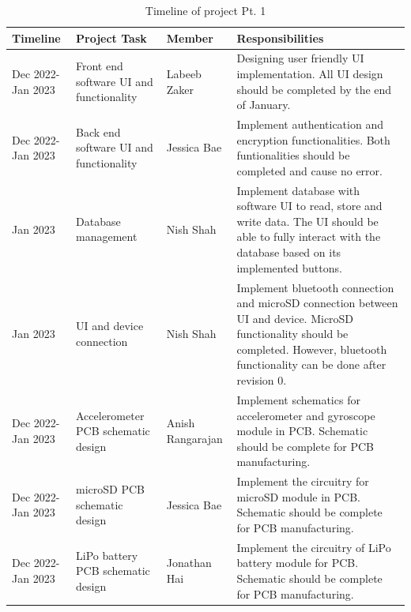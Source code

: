 \documentclass[12pt, titlepage]{article}
\begin{document}
\begin{table}[H]
\caption{\label{Timeline}Timeline of project Pt. 1}  
	\begin{tabular}{ | p{2.25cm} | p{4cm} |  p{3.5cm} | p{5.5cm} |}
		 \hline
		 \textbf{Timeline} & \textbf{Project Task} & \textbf{Member} & \textbf{Responsibilities}\\
		 \hline
		Dec 2022\newline- Jan 2023 & Front end software UI and functionality & Labeeb Zaker & Designing user friendly UI implementation. All UI design should be completed by the end of January.\\
		\hline
		Dec 2022\newline- Jan 2023 & Back end software UI and functionality & Jessica Bae & Implement authentication and encryption functionalities. Both funtionalities should be completed and cause no error. \\
		\hline
		Jan 2023 & Database management & Nish Shah & Implement database with software UI to read, store and write data. The UI should be able to fully interact with the database based on its implemented buttons.\\
		\hline
		Jan 2023 & UI and device connection & Nish Shah &Implement bluetooth connection and microSD connection between UI and device. MicroSD functionality should be completed. However, bluetooth functionality can be done after revision 0.\\
		\hline
		Dec 2022\newline- Jan 2023 & Accelerometer PCB schematic design & Anish Rangarajan & Implement schematics for accelerometer and gyroscope module in PCB. Schematic should be complete for PCB manufacturing.\\
		\hline
		Dec 2022\newline- Jan 2023 & microSD PCB schematic design & Jessica Bae & Implement the circuitry for microSD module in PCB. Schematic should be complete for PCB manufacturing.\\
		\hline
		Dec 2022\newline- Jan 2023 & LiPo battery PCB schematic design & Jonathan Hai & Implement the circuitry of LiPo battery module for PCB. Schematic should be complete for PCB manufacturing.\\
		\hline
	\end{tabular}
\end{table}
\end{document}

